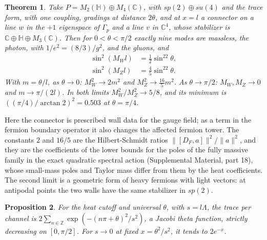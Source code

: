 \documentclass[aps,prd,reprint,onecolumn,nofootinbib,amsmath,amssymb,floatfix]{revtex4-2}
\theoremstyle{plain}
\newtheorem{theorem}{Theorem}
\newtheorem{proposition}[theorem]{Proposition}
\newcommand{\C}{\mathbb C}
\renewcommand{\H}{\mathbb H}
\newcommand{\supp}[1]{Supplemental Material, part #1}
\begin{document}
\begin{theorem}\label{thm:wz}
Take $P=M_2(\H)\oplus M_4(\C)$, with $sp(2)\oplus su(4)$ and the trace form, with one coupling, gradings at distance $2\theta$, and at $x=l$ a connector on a line $w$ in the $+1$ eigenspace of $\Gamma_p$ and a line $v$ in $\C^4$, whose stabilizer is $\C\oplus\H\oplus M_3(\C)$. Then for $0<\theta<\pi/2$ exactly nine modes are massless, the photon, with $1/e^2=(8/3)/g^2$, and the gluons, and
\begin{equation}
\begin{aligned}
\sin^2(M_Wl)&=\tfrac12\sin^22\theta,\\
\sin^2(M_Zl)&=\tfrac45\sin^22\theta.
\end{aligned}
\end{equation}
With $m=\theta/l$, as $\theta\to0$: $M_W^2\to2m^2$ and $M_Z^2\to\tfrac{16}5m^2$. As $\theta\to\pi/2$: $M_W,M_Z\to0$ and $m\to\pi/(2l)$. In both limits $M_W^2/M_Z^2\to5/8$, and its minimum is $((\pi/4)/\arctan2)^2=0.503$ at $\theta=\pi/4$.
\end{theorem}

Here the connector is prescribed wall data for the gauge field; as a term in the fermion boundary operator it also changes the affected fermion tower. The constants $2$ and $16/5$ are the Hilbert-Schmidt ratios $\|[D_F,a]\|^2/\|a\|^2$, and they are the coefficients of the lower bounds for the poles of the fully massive family in the exact quadratic spectral action (\supp{18}), whose small-mass poles and Taylor mass differ from them by the heat coefficients. The second limit is a geometric form of heavy fermions with light vectors: at antipodal points the two walls have the same stabilizer in $sp(2)$.

\begin{proposition}\label{prop:theta}
For the heat cutoff and universal $\theta$, with $s=l\Lambda$, the trace per channel is $2\sum_{n\in\mathbb Z}\exp(-(n\pi+\theta)^2/s^2)$, a Jacobi theta function, strictly decreasing on $[0,\pi/2]$. For $s\to0$ at fixed $x=\theta^2/s^2$, it tends to $2e^{-x}$.
\end{proposition}
\end{document}
